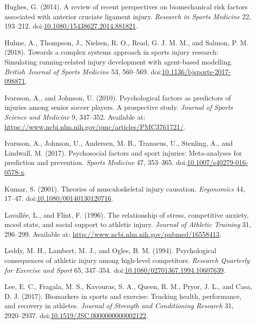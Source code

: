 \documentclass[utf8]{frontiersHLTH}
\begin{document}
\leavevmode\hypertarget{ref-Hughes2014}{}%
Hughes, G. (2014). A review of recent perspectives on biomechanical risk
factors associated with anterior cruciate ligament injury.
\emph{Research in Sports Medicine} 22, 193--212.
doi:\href{https://doi.org/10.1080/15438627.2014.881821}{10.1080/15438627.2014.881821}.

\leavevmode\hypertarget{ref-Hulme2018}{}%
Hulme, A., Thompson, J., Nielsen, R. O., Read, G. J. M. M., and Salmon,
P. M. (2018). Towards a complex systems approach in sports injury
research: Simulating running-related injury development with agent-based
modelling. \emph{British Journal of Sports Medicine} 53, 560--569.
doi:\href{https://doi.org/10.1136/bjsports-2017-098871}{10.1136/bjsports-2017-098871}.

\leavevmode\hypertarget{ref-Ivarsson2010}{}%
Ivarsson, A., and Johnson, U. (2010). Psychological factors as
predictors of injuries among senior soccer players. A prospective study.
\emph{Journal of Sports Science and Medicine} 9, 347--352. Available at:
\url{https://www.ncbi.nlm.nih.gov/pmc/articles/PMC3761721/}.

\leavevmode\hypertarget{ref-Ivarsson2017}{}%
Ivarsson, A., Johnson, U., Andersen, M. B., Tranaeus, U., Stenling, A.,
and Lindwall, M. (2017). Psychosocial factors and sport injuries:
Meta-analyses for prediction and prevention. \emph{Sports Medicine} 47,
353--365.
doi:\href{https://doi.org/10.1007/s40279-016-0578-x}{10.1007/s40279-016-0578-x}.

\leavevmode\hypertarget{ref-Kumar2001}{}%
Kumar, S. (2001). Theories of musculoskeletal injury causation.
\emph{Ergonomics} 44, 17--47.
doi:\href{https://doi.org/10.1080/00140130120716}{10.1080/00140130120716}.

\leavevmode\hypertarget{ref-Lavallee1996}{}%
Lavallée, L., and Flint, F. (1996). The relationship of stress,
competitive anxiety, mood state, and social support to athletic injury.
\emph{Journal of Athletic Training} 31, 296--299. Available at:
\url{http://www.ncbi.nlm.nih.gov/pubmed/16558413}.

\leavevmode\hypertarget{ref-Leddy1994}{}%
Leddy, M. H., Lambert, M. J., and Ogles, B. M. (1994). Psychological
consequences of athletic injury among high-level competitors.
\emph{Research Quarterly for Exercise and Sport} 65, 347--354.
doi:\href{https://doi.org/10.1080/02701367.1994.10607639}{10.1080/02701367.1994.10607639}.

\leavevmode\hypertarget{ref-Lee2017}{}%
Lee, E. C., Fragala, M. S., Kavouras, S. A., Queen, R. M., Pryor, J. L.,
and Casa, D. J. (2017). Biomarkers in sports and exercise: Tracking
health, performance, and recovery in athletes. \emph{Journal of Strength
and Conditioning Research} 31, 2920--2937.
doi:\href{https://doi.org/10.1519/JSC.0000000000002122}{10.1519/JSC.0000000000002122}.
\end{document}
